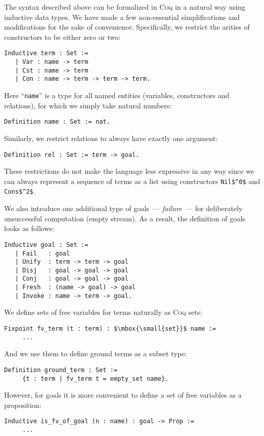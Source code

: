 The syntax described above can be formalized in \textsc{Coq} in a natural way using inductive data types. We have made a few non-essential simplifications and modifications for the sake of convenience.
Specifically, we restrict the arities of constructors to be either zero or two:

\begin{lstlisting}[language=Coq] 
   Inductive term : Set :=
   | Var : name -> term
   | Cst : name -> term
   | Con : name -> term -> term -> term.
\end{lstlisting}

Here ``\lstinline[language=Coq]{name}'' is a type for all named entities (variables, constructors and relations), for which we simply take natural numbers:

\begin{lstlisting}[language=Coq]
  Definition name : Set := nat.
\end{lstlisting}

Similarly, we restrict relations to always have exactly one argument:

\begin{lstlisting}[language=Coq]
   Definition rel : Set := term -> goal.
\end{lstlisting}

These restrictions do not make the language less expressive in any way since we can always represent a sequence of terms as a list using constructors \lstinline|Nil$^0$| and \lstinline|Cons$^2$|.

We also introduce one additional type of goals~--- \emph{failure}~--- for deliberately unsuccessful computation (empty stream). As a result, the definition of goals looks as follows:

\begin{lstlisting}[language=Coq] 
   Inductive goal : Set :=
   | Fail   : goal
   | Unify  : term -> term -> goal
   | Disj   : goal -> goal -> goal
   | Conj   : goal -> goal -> goal
   | Fresh  : (name -> goal) -> goal
   | Invoke : name -> term -> goal.
\end{lstlisting}

{ \color{red}

We define sets of free variables for terms naturally as \textsc{Coq} sets: 

\begin{lstlisting}[language=Coq,mathescape=true] 
   Fixpoint fv_term (t : term) : $\mbox{\small{set}}$ name :=
     ...
\end{lstlisting}

And we use them to define ground terms as a subset type:

\begin{lstlisting}[language=Coq]
   Definition ground_term : Set :=
     {t : term | fv_term t = empty_set name}.
\end{lstlisting}

However, for goals it is more convenient to define a set of free variables as a proposition:

\begin{lstlisting}[language=Coq]
   Inductive is_fv_of_goal (n : name) : goal -> Prop :=
     ...
\end{lstlisting}

}

